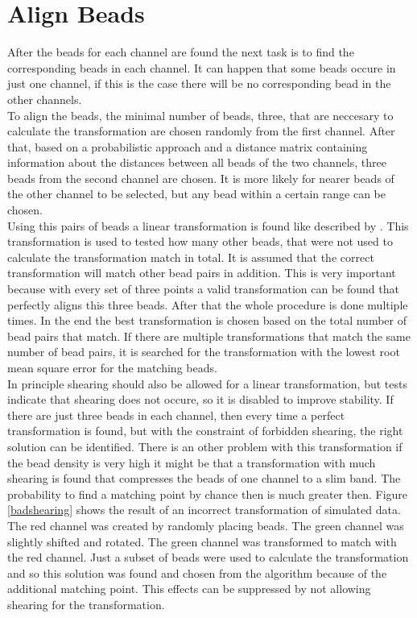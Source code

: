 \section{Align Beads}
After the beads for each channel are found the next task is to find the corresponding
beads in each channel. It can happen that some beads occure in just one channel,
if this is the case there will be no corresponding bead in the other
channels.\\
To align the beads, the minimal number of beads, three, that are neccesary to
calculate the transformation are chosen randomly from the first channel. After that, based on
a probabilistic approach and a distance matrix containing information about the
distances between all beads of the two channels, three beads from the
second channel are chosen. It is more likely for nearer beads of the other channel to be selected, but any bead within a certain range can be chosen.\\
Using this pairs of beads a linear transformation is found like described by
\cite{MAJoachim}.\newline
This transformation is used to tested how many other beads, that were not used to calculate the transformation match in
total. It is assumed that the correct transformation will match other bead pairs in addition.
This is very important because with every set of three points a valid transformation can be found that perfectly aligns this three beads. After that the whole
procedure is done multiple times. In the end the best transformation is
chosen based on the total number of bead pairs that match. If there are multiple transformations that match the same number of bead pairs, it is searched for the transformation with the lowest root mean square error for the matching beads.\\
In principle shearing should also be allowed for a linear transformation, but tests
indicate that shearing does not occure, so it is disabled to improve stability. If there are just
three beads in each channel, then every time a perfect transformation is found,
but with the constraint of forbidden shearing, the right solution can be
identified. There is an other problem with this transformation if the bead density is very high it might be that a transformation with much shearing is found that compresses the beads of one channel to a slim band. The probability to find a matching point by chance then is much greater then. Figure \ref{badshearing} shows the result of an incorrect transformation of simulated data. The red channel was created by randomly placing beads. The green channel was slightly shifted and rotated. The green channel was transformed to match with the red channel. Just a subset of beads were used to calculate the transformation and so this solution was found and chosen from the algorithm because of the additional matching point.\newline
This effects can be suppressed by not allowing shearing for the transformation.

